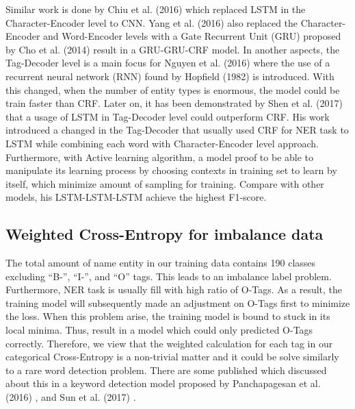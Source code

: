 Similar work is done by Chiu et al. (2016) \cite{DBLP:journals/corr/ChiuN15} which replaced LSTM in the Character-Encoder level to CNN.
Yang et al. (2016) \cite{DBLP:journals/corr/YangSC16} also replaced the Character-Encoder and Word-Encoder levels with a Gate Recurrent Unit (GRU) proposed by Cho et al. (2014) \cite{DBLP:journals/corr/ChoMGBSB14} result in a GRU-GRU-CRF model.
In another aspects, the Tag-Decoder level is a main focus for Nguyen et al. (2016) \cite{DBLP:journals/corr/NguyenSDF16} where the use of a recurrent neural network (RNN) found by Hopfield (1982) \cite{hopfield1982neural} is introduced.
With this changed, when the number of entity types is enormous, the model could be train faster than CRF.
Later on, it has been demonstrated by Shen et al. (2017) \cite{DBLP:journals/corr/ShenYLKA17} that a usage of LSTM in Tag-Decoder level could outperform CRF.
His work introduced a changed in the Tag-Decoder that usually used CRF for NER task to LSTM while combining each word with Character-Encoder level approach.
Furthermore, with Active learning algorithm, a model proof to be able to manipulate its learning process by choosing contexts in training set to learn by itself, which minimize amount of sampling for training.
Compare with other models, his LSTM-LSTM-LSTM achieve the highest F1-score.


\subsection{Weighted Cross-Entropy for imbalance data}

The total amount of name entity in our training data contains 190 classes excluding ``B-'', ``I-'', and ``O'' tags.
This leads to an imbalance label problem. Furthermore, NER task is usually fill with high ratio of O-Tags.
As a result, the training model will subsequently made an adjustment on O-Tags first to minimize the loss.
When this problem arise, the training model is bound to stuck in its local minima.
Thus, result in a model which could only predicted O-Tags correctly.
Therefore, we view that the weighted calculation for each tag in our categorical Cross-Entropy is a non-trivial matter and it could be solve similarly to a rare word detection problem.
There are some published which discussed about this in a keyword detection model proposed by Panchapagesan et al. (2016) \cite{DBLP:conf/interspeech/PanchapagesanSK16}, and Sun et al. (2017) \cite{DBLP:journals/corr/SunRTPFMMSV17}.

